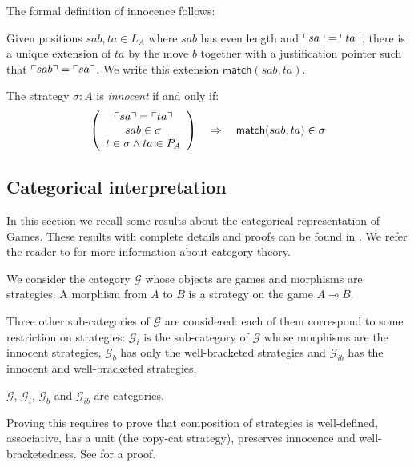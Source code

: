 The formal definition of innocence follows:
\begin{dfn}[Innocence]
Given positions $sab, ta \in L_A$ where $sab$ has even length and
$\ulcorner sa \urcorner = \ulcorner ta \urcorner$, there is a unique extension of $ta$ by
the move $b$ together with a justification pointer such that
$\ulcorner sab \urcorner = \ulcorner sa \urcorner$. We write this extension
$\textsf{match}(sab,ta)$.

The strategy $\sigma:A$ is \emph{innocent} if and only if:
$$ \left(
     \begin{array}{c}
       \ulcorner sa \urcorner = \ulcorner ta \urcorner \\
       sab \in \sigma \\
       t\in \sigma \wedge ta \in P_A \\
     \end{array}
   \right)
\quad \Rightarrow\quad  \textsf{match}(sab,ta) \in \sigma$$

\end{dfn}


\subsection{Categorical interpretation}

In this section we recall some results about the categorical representation of Games.
These results with complete details and proofs can be found in \cite{McC96b,hylandong_pcf,abramsky94full}.
We refer the reader to \cite{CroleRL:catt} for more information about category theory.

We consider the category $\mathcal{G}$ whose objects are games and morphisms are
strategies. A morphism from $A$ to $B$ is a strategy on the game $A \multimap B$.

Three other sub-categories of $\mathcal{G}$ are considered: each of them correspond to some restriction on strategies:
$\mathcal{G}_i$ is the sub-category
of $\mathcal{G}$ whose morphisms are the innocent strategies,
$\mathcal{G}_b$ has only the well-bracketed strategies and $\mathcal{G}_{ib}$ has the innocent and well-bracketed strategies.

\begin{prop}
$\mathcal{G}$, $\mathcal{G}_i$, $\mathcal{G}_b$ and $\mathcal{G}_{ib}$ are categories.
\end{prop}

Proving this requires to prove that composition of strategies is well-defined, associative, has a unit (the copy-cat strategy), preserves innocence and
well-bracketedness. See \cite{hylandong_pcf,abramsky94full} for a proof.


